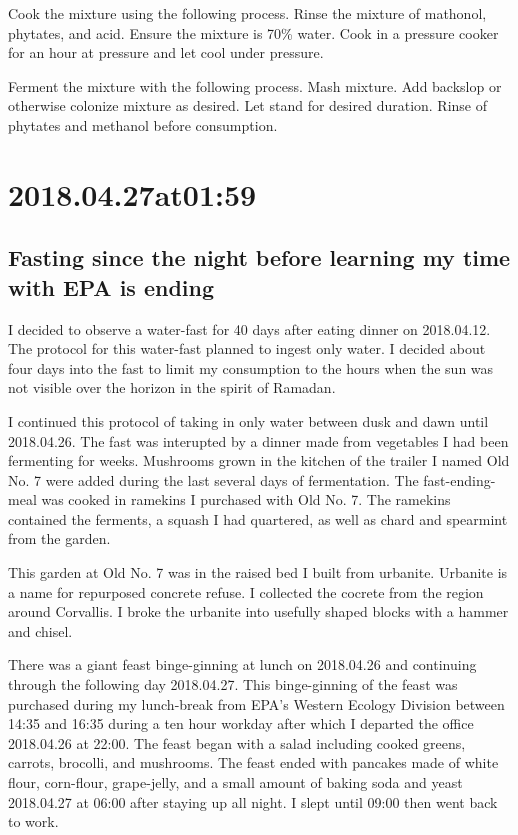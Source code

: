 \begin{enumerate}
\begin{enumerate}
Cook the mixture using the following process.
Rinse the mixture of mathonol, phytates, and acid.
Ensure the mixture is 70\% water.
Cook in a pressure cooker for an hour at pressure and let cool under pressure.

Ferment the mixture with the following process.
Mash mixture.
Add backslop or otherwise colonize mixture as desired.
Let stand for desired duration.
Rinse of phytates and methanol before consumption.

\section*{ 2018.04.27at01:59 }
\subsection*{ Fasting since the night before learning my time with EPA is ending }
I decided to observe a water-fast for 40 days after eating dinner on 2018.04.12.
The protocol for this water-fast planned to ingest only water.
I decided about four days into the fast to limit my consumption to the hours when the sun was not visible over the horizon in the spirit of Ramadan.

I continued this protocol of taking in only water between dusk and dawn until 2018.04.26.
The fast was interupted by a dinner made from vegetables I had been fermenting for weeks.
Mushrooms grown in the kitchen of the trailer I named Old No. 7 were added during the last several days of fermentation.
The fast-ending-meal was cooked in ramekins I purchased with Old No. 7.
The ramekins contained the ferments, a squash I had quartered, as well as chard and spearmint from the garden.

This garden at Old No. 7 was in the raised bed I built from urbanite.
Urbanite is a name for repurposed concrete refuse.
I collected the cocrete from the region around Corvallis.
I broke the urbanite into usefully shaped blocks with a hammer and chisel.

There was a giant feast binge-ginning at lunch on 2018.04.26 and continuing through the following day 2018.04.27.
This binge-ginning of the feast was purchased during my lunch-break from EPA's Western Ecology Division between 14:35 and 16:35 during a ten hour workday after which I departed the office 2018.04.26 at 22:00.
The feast began with a salad including cooked greens, carrots, brocolli, and mushrooms.
The feast ended with pancakes made of white flour, corn-flour, grape-jelly, and a small amount of baking soda and yeast 2018.04.27 at 06:00 after staying up all night.
I slept until 09:00 then went back to work.


\end{enumerate}
\end{enumerate}
